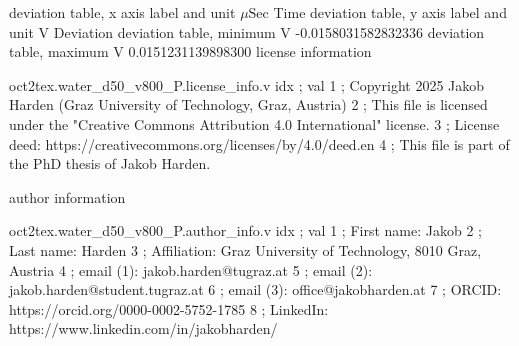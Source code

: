 \expandafter\def\csname oct2tex.water_d50_v800_P.dtabxlbl.d\endcsname{deviation table, x axis label and unit}
\expandafter\def\csname oct2tex.water_d50_v800_P.dtabxlbl.u\endcsname{\ensuremath{\mu\text{Sec}}}
\expandafter\def\csname oct2tex.water_d50_v800_P.dtabxlbl.v\endcsname{Time}
\expandafter\def\csname oct2tex.water_d50_v800_P.dtabylbl.d\endcsname{deviation table, y axis label and unit}
\expandafter\def\csname oct2tex.water_d50_v800_P.dtabylbl.u\endcsname{\ensuremath{\text{V}}}
\expandafter\def\csname oct2tex.water_d50_v800_P.dtabylbl.v\endcsname{Deviation}
\expandafter\def\csname oct2tex.water_d50_v800_P.dtabmin.d\endcsname{deviation table, minimum}
\expandafter\def\csname oct2tex.water_d50_v800_P.dtabmin.u\endcsname{\ensuremath{\text{V}}}
\expandafter\def\csname oct2tex.water_d50_v800_P.dtabmin.v\endcsname{-0.0158031582832336}
\expandafter\def\csname oct2tex.water_d50_v800_P.dtabmax.d\endcsname{deviation table, maximum}
\expandafter\def\csname oct2tex.water_d50_v800_P.dtabmax.u\endcsname{\ensuremath{\text{V}}}
\expandafter\def\csname oct2tex.water_d50_v800_P.dtabmax.v\endcsname{0.0151231139898300}
\expandafter\def\csname oct2tex.water_d50_v800_P.license_info.d\endcsname{license information}
\begin{filecontents}[overwrite]{oct2tex.water_d50_v800_P.license_info.v}
idx ; val
1 ; Copyright 2025 Jakob Harden (Graz University of Technology, Graz, Austria)
2 ; This file is licensed under the "Creative Commons Attribution 4.0 International" license.
3 ; License deed: https://creativecommons.org/licenses/by/4.0/deed.en
4 ; This file is part of the PhD thesis of Jakob Harden.
\end{filecontents}
\expandafter\def\csname oct2tex.water_d50_v800_P.author_info.d\endcsname{author information}
\begin{filecontents}[overwrite]{oct2tex.water_d50_v800_P.author_info.v}
idx ; val
1 ; First name: Jakob
2 ; Last name: Harden
3 ; Affiliation: Graz University of Technology, 8010 Graz, Austria
4 ; email (1): jakob.harden@tugraz.at
5 ; email (2): jakob.harden@student.tugraz.at
6 ; email (3): office@jakobharden.at
7 ; ORCID: https://orcid.org/0000-0002-5752-1785
8 ; LinkedIn: https://www.linkedin.com/in/jakobharden/
\end{filecontents}
